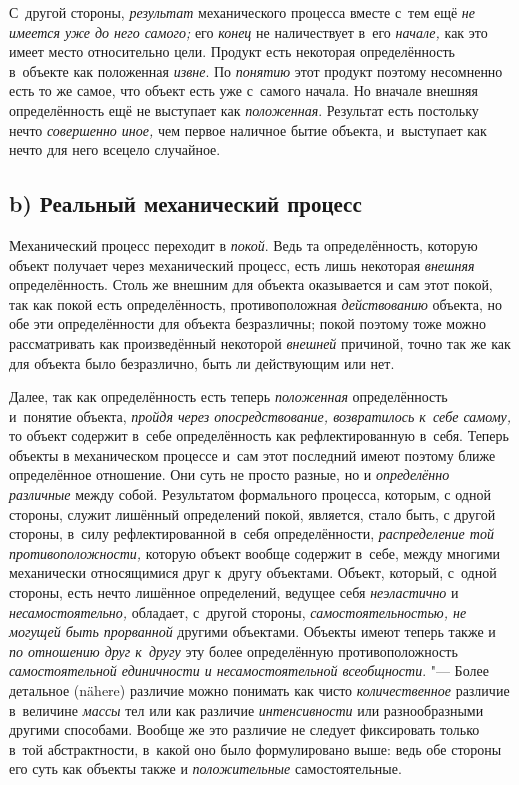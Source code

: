 С~другой стороны, {\em результат} механического процесса вместе с~тем ещё
{\em не имеется уже до него самого;} его {\em конец} не наличествует в~его
{\em начале,} как это имеет место относительно цели. Продукт есть некоторая
определённость в~объекте как положенная {\em извне}. По {\em понятию}
этот продукт поэтому несомненно есть то же самое, что объект
есть уже с~самого начала. Но вначале внешняя определённость ещё не
выступает как {\em положенная}. Результат есть постольку нечто
{\em совершенно иное,} чем первое наличное бытие объекта, и~выступает
как нечто для него всецело случайное.

\subsection[b) Реальный механический процесс]{b) Реальный механический процесс}

Механический процесс переходит в {\em покой}. Ведь та
определённость, которую объект получает через механический процесс, есть
лишь некоторая {\em внешняя}
определённость. Столь же внешним для объекта оказывается и
сам этот покой, так как покой есть определённость, противоположная
{\em действованию}
объекта, но обе эти определённости для объекта безразличны;
покой поэтому тоже можно рассматривать как произведённый некоторой
{\em внешней} причиной,
точно так же как для объекта было безразлично, быть ли действующим или нет.

Далее, так как определённость есть теперь
{\em положенная}
определённость и~понятие объекта,
{\em пройдя через опосредствование,
возвратилось к~себе самому,} то объект содержит в~себе
определённость как рефлектированную в~себя. Теперь объекты в
механическом процессе и~сам этот последний имеют поэтому ближе определённое
отношение. Они суть не просто разные, но и
{\em определённо различные}
между собой. Результатом формального процесса, которым, с
одной стороны, служит лишённый определений покой, является, стало быть, с
другой стороны, в~силу рефлектированной в~себя определённости,
{\em распределение той
противоположности,} которую объект вообще содержит в~себе,
между многими механически относящимися друг к~другу объектами. Объект,
который, с~одной стороны, есть нечто лишённое определений, ведущее себя
{\em неэластично} и
{\em несамостоятельно,}
обладает, с~другой стороны,
{\em самостоятельностью, не могущей быть
прорванной} другими объектами. Объекты имеют теперь также и
{\em по отношению друг к~другу}
эту более определённую противоположность
{\em самостоятельной единичности и
несамостоятельной всеобщности}. "--- Более детальное (nähere)
различие можно понимать как чисто
{\em количественное}
различие в~величине
{\em массы} тел или как
различие {\em интенсивности}
или разнообразными другими способами. Вообще же это различие
не следует фиксировать только в~той абстрактности, в~какой оно было
формулировано выше: ведь обе стороны его суть как объекты также и
{\em положительные}
самостоятельные.

